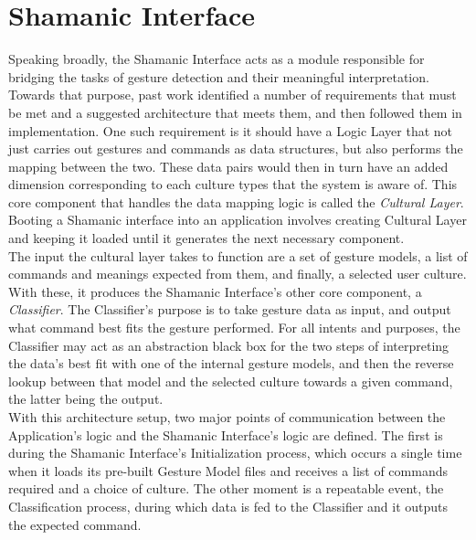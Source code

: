 \section{Shamanic Interface} \label{sec:develop_interface}
    Speaking broadly, the Shamanic Interface acts as a module responsible for bridging the tasks of gesture detection and their meaningful interpretation. Towards that purpose, past work identified a number of requirements that must be met and a suggested architecture that meets them, and then followed them in implementation. One such requirement is it should have a Logic Layer that not just carries out gestures and commands as data structures, but also performs the mapping between the two. These data pairs would then in turn have an added dimension corresponding to each culture types that the system is aware of. This core component that handles the data mapping logic is called the \emph{Cultural Layer}. Booting a Shamanic interface into an application involves creating Cultural Layer and keeping it loaded until it generates the next necessary component. \\
    The input the cultural layer takes to function are a set of gesture models, a list of commands and meanings expected from them, and finally, a selected user culture. With these, it produces the Shamanic Interface’s other core component, a \emph{Classifier}. The Classifier’s purpose is to take gesture data as input, and output what command best fits the gesture performed. For all intents and purposes, the Classifier may act as an abstraction black box for the two steps of interpreting the data’s best fit with one of the internal gesture models, and then the reverse lookup between that model and the selected culture towards a given command, the latter being the output.\\
    With this architecture setup, two major points of communication between the Application’s logic and the Shamanic Interface’s logic are defined. The first is during the Shamanic Interface’s Initialization process, which occurs a single time when it loads its pre-built Gesture Model files and receives a list of commands required and a choice of culture. The other moment is a repeatable event, the Classification process, during which data is fed to the Classifier and it outputs the expected command.\\
    
